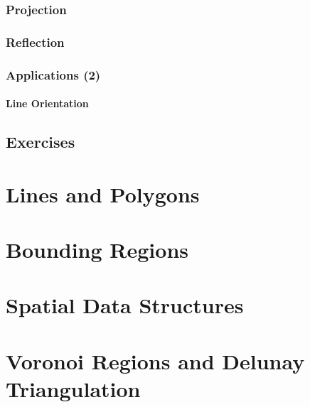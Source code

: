 \documentclass[12pt]{report}
\begin{document}
\subsection{Projection}
\subsection{Reflection}
\subsection{Applications (2)}
	\subsubsection{Line Orientation}
\section{Exercises}

\chapter{Lines and Polygons}
\chapter{Bounding Regions}
\chapter{Spatial Data Structures}
\chapter{Voronoi Regions and Delunay Triangulation}
\end{document}
